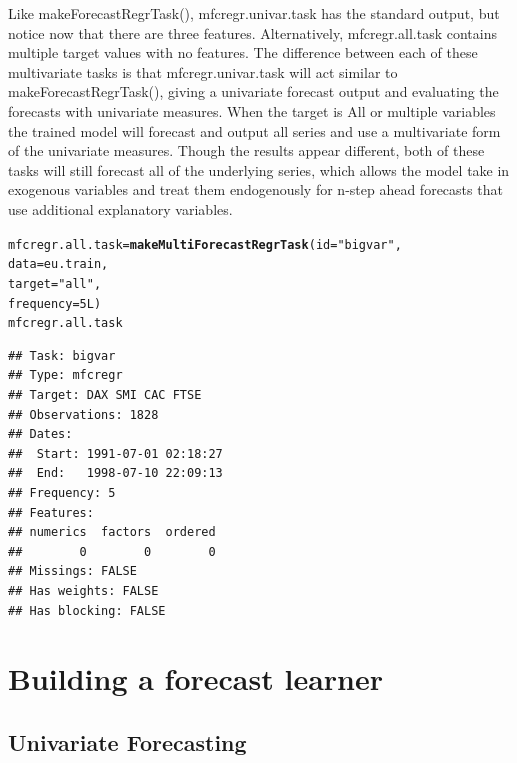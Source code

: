 \documentclass[12pt]{article}\usepackage[]{graphicx}\usepackage[]{color}
\makeatletter
\newcommand{\hlnum}[1]{\textcolor[rgb]{0.686,0.059,0.569}{#1}}%
\newcommand{\hlstr}[1]{\textcolor[rgb]{0.192,0.494,0.8}{#1}}%
\newcommand{\hlstd}[1]{\textcolor[rgb]{0.345,0.345,0.345}{#1}}%
\newcommand{\hlkwb}[1]{\textcolor[rgb]{0.69,0.353,0.396}{#1}}%
\newcommand{\hlkwc}[1]{\textcolor[rgb]{0.333,0.667,0.333}{#1}}%
\newcommand{\hlkwd}[1]{\textcolor[rgb]{0.737,0.353,0.396}{\textbf{#1}}}%
\newenvironment{kframe}{%
 \def\at@end@of@kframe{}%
 \ifinner\ifhmode%
  \def\at@end@of@kframe{\end{minipage}}%
  \begin{minipage}{\columnwidth}%
 \fi\fi%
 \def\FrameCommand##1{\hskip\@totalleftmargin \hskip-\fboxsep
 \colorbox{shadecolor}{##1}\hskip-\fboxsep
     \hskip-\linewidth \hskip-\@totalleftmargin \hskip\columnwidth}%
 \MakeFramed {\advance\hsize-\width
   \@totalleftmargin\z@ \linewidth\hsize
   \@setminipage}}%
 {\par\unskip\endMakeFramed%
 \at@end@of@kframe}
\newenvironment{knitrout}{}{} %
\theoremstyle{definition}
\newcommand\code{\@codex}
\def\@codex#1{{\normalfont\ttfamily\hyphenchar\font=-1 #1}}
\makeatother
\begin{document}
Like \code{makeForecastRegrTask()}, \code{mfcregr.univar.task} has the standard output, but notice now that there are three features. Alternatively, \code{mfcregr.all.task} contains multiple target values with no features. The difference between each of these multivariate tasks is that \code{mfcregr.univar.task} will act similar to \code{makeForecastRegrTask()}, giving a univariate forecast output and evaluating the forecasts with univariate measures. When the target is \code{All} or multiple variables the trained model will forecast and output all series and use a multivariate form of the univariate measures. Though the results appear different, both of these tasks will still forecast all of the underlying series, which allows the model take in exogenous variables and treat them endogenously for n-step ahead forecasts that use additional explanatory variables.

\singlespacing
\begin{knitrout}
\color{fgcolor}\begin{kframe}
\begin{alltt}
\hlstd{mfcregr.all.task} \hlkwb{=} \hlkwd{makeMultiForecastRegrTask}\hlstd{(}\hlkwc{id} \hlstd{=} \hlstr{"bigvar"}\hlstd{,}
                                      \hlkwc{data} \hlstd{= eu.train,}
                                      \hlkwc{target} \hlstd{=} \hlstr{"all"}\hlstd{,}
                                      \hlkwc{frequency} \hlstd{=} \hlnum{5L}\hlstd{)}
\hlstd{mfcregr.all.task}
\end{alltt}
\begin{verbatim}
## Task: bigvar
## Type: mfcregr
## Target: DAX SMI CAC FTSE
## Observations: 1828
## Dates:
##  Start: 1991-07-01 02:18:27 
##  End:   1998-07-10 22:09:13
## Frequency: 5
## Features:
## numerics  factors  ordered 
##        0        0        0 
## Missings: FALSE
## Has weights: FALSE
## Has blocking: FALSE
\end{verbatim}
\end{kframe}
\end{knitrout}
\doublespacing

\section{Building a forecast learner}
\label{seq:build}
\subsection{Univariate Forecasting}
\label{seq:buildAndTuneUni}
\end{document}
